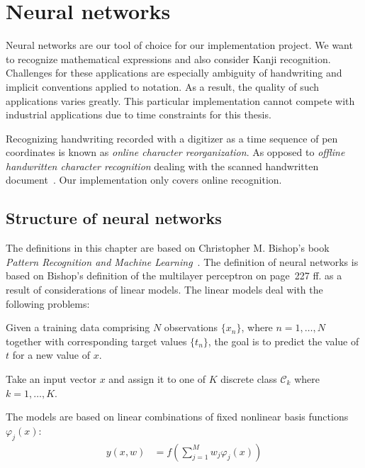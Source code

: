 \chapter{Neural networks}
%
Neural networks are our tool of choice for our implementation project.
We want to recognize mathematical expressions and also consider Kanji recognition.
Challenges for these applications are especially ambiguity of handwriting and implicit
conventions applied to notation. As a result, the quality of such applications
varies greatly.
This particular implementation cannot compete with industrial applications due to time constraints for this thesis.

Recognizing handwriting recorded with a digitizer as a time sequence of pen
coordinates is known as \emph{online character reorganization}.
As opposed to \emph{offline handwritten character recognition} dealing
with the scanned handwritten document~\cite{kumar2013offline}.
Our implementation only covers online recognition.

\section{Structure of neural networks}
%
The definitions in this chapter are based on Christopher M. Bishop's book \emph{Pattern Recognition and Machine Learning}~\cite{Bishop}. The definition of neural networks is based on Bishop's definition of the multilayer perceptron on page~227 ff. as a result of considerations of linear models. The linear models deal with the following problems:

\begin{problem}
  Given a training data comprising $N$ observations $\{x_n\}$, where $n = 1, \ldots, N$ together with corresponding target values $\{t_n\}$, the goal is to predict the value of $t$ for a new value of $x$.~\cite[p.~138]{Bishop}
\end{problem}

\begin{problem}
  Take an input vector $x$ and assign it to one of $K$ discrete class $\mathcal C_k$ where $k = 1, \ldots, K$.~\cite[p.~179]{Bishop}
\end{problem}

The models are based on linear combinations of fixed nonlinear basis functions~$\varphi_j(x)$:
\begin{align}
  y(x, w) &= f\left(\sum_{j=1}^M w_j \varphi_j(x)\right)
\end{align}

